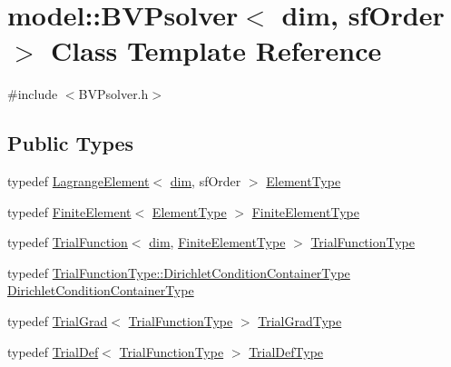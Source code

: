 \hypertarget{classmodel_1_1_b_v_psolver}{}\section{model\+:\+:B\+V\+Psolver$<$ dim, sf\+Order $>$ Class Template Reference}
\label{classmodel_1_1_b_v_psolver}


{\ttfamily \#include $<$B\+V\+Psolver.\+h$>$}

\subsection*{Public Types}
\begin{DoxyCompactItemize}
\item 
typedef \hyperlink{classmodel_1_1_lagrange_element}{Lagrange\+Element}$<$ \hyperlink{plot_nd_a_8m_a382f3ca768b275b8d563604f7fc7df73}{dim}, sf\+Order $>$ \hyperlink{classmodel_1_1_b_v_psolver_ae2e9c254c6f06d0217b460e184f1dbc0}{Element\+Type}
\item 
typedef \hyperlink{classmodel_1_1_finite_element}{Finite\+Element}$<$ \hyperlink{classmodel_1_1_b_v_psolver_ae2e9c254c6f06d0217b460e184f1dbc0}{Element\+Type} $>$ \hyperlink{classmodel_1_1_b_v_psolver_a010425e48ff247a2d8203f4625b29ea1}{Finite\+Element\+Type}
\item 
typedef \hyperlink{classmodel_1_1_trial_function}{Trial\+Function}$<$ \hyperlink{plot_nd_a_8m_a382f3ca768b275b8d563604f7fc7df73}{dim}, \hyperlink{classmodel_1_1_b_v_psolver_a010425e48ff247a2d8203f4625b29ea1}{Finite\+Element\+Type} $>$ \hyperlink{classmodel_1_1_b_v_psolver_a931b55260404ec986f534d8aafc20a68}{Trial\+Function\+Type}
\item 
typedef \hyperlink{classmodel_1_1_trial_function_ae83a85333510ff0e0823e6cb748774ed}{Trial\+Function\+Type\+::\+Dirichlet\+Condition\+Container\+Type} \hyperlink{classmodel_1_1_b_v_psolver_a3c554c06786ce95b5d2078baf47ad817}{Dirichlet\+Condition\+Container\+Type}
\item 
typedef \hyperlink{classmodel_1_1_trial_grad}{Trial\+Grad}$<$ \hyperlink{classmodel_1_1_b_v_psolver_a931b55260404ec986f534d8aafc20a68}{Trial\+Function\+Type} $>$ \hyperlink{classmodel_1_1_b_v_psolver_afbb1489d0aef7b6b1057f0473801bfaf}{Trial\+Grad\+Type}
\item 
typedef \hyperlink{classmodel_1_1_trial_def}{Trial\+Def}$<$ \hyperlink{classmodel_1_1_b_v_psolver_a931b55260404ec986f534d8aafc20a68}{Trial\+Function\+Type} $>$ \hyperlink{classmodel_1_1_b_v_psolver_aa514066cc07fb36e5f66dcc384b81309}{Trial\+Def\+Type}

\end{DoxyCompactItemize}
